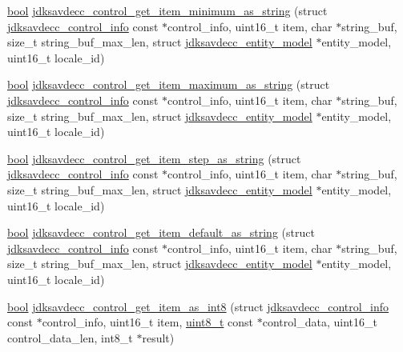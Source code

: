 \begin{DoxyCompactItemize}
\item 
\hyperlink{avb__gptp_8h_af6a258d8f3ee5206d682d799316314b1}{bool} \hyperlink{group__aem__control__value__helpers_ga9226ea8b67000e20966e5b45cd208fcd}{jdksavdecc\+\_\+control\+\_\+get\+\_\+item\+\_\+minimum\+\_\+as\+\_\+string} (struct \hyperlink{structjdksavdecc__control__info}{jdksavdecc\+\_\+control\+\_\+info} const $\ast$control\+\_\+info, uint16\+\_\+t item, char $\ast$string\+\_\+buf, size\+\_\+t string\+\_\+buf\+\_\+max\+\_\+len, struct \hyperlink{structjdksavdecc__entity__model}{jdksavdecc\+\_\+entity\+\_\+model} $\ast$entity\+\_\+model, uint16\+\_\+t locale\+\_\+id)
\item 
\hyperlink{avb__gptp_8h_af6a258d8f3ee5206d682d799316314b1}{bool} \hyperlink{group__aem__control__value__helpers_ga6a350cb659c0d7627d73ca704b0dc36f}{jdksavdecc\+\_\+control\+\_\+get\+\_\+item\+\_\+maximum\+\_\+as\+\_\+string} (struct \hyperlink{structjdksavdecc__control__info}{jdksavdecc\+\_\+control\+\_\+info} const $\ast$control\+\_\+info, uint16\+\_\+t item, char $\ast$string\+\_\+buf, size\+\_\+t string\+\_\+buf\+\_\+max\+\_\+len, struct \hyperlink{structjdksavdecc__entity__model}{jdksavdecc\+\_\+entity\+\_\+model} $\ast$entity\+\_\+model, uint16\+\_\+t locale\+\_\+id)
\item 
\hyperlink{avb__gptp_8h_af6a258d8f3ee5206d682d799316314b1}{bool} \hyperlink{group__aem__control__value__helpers_gaf2be8c114d29b4802860d1380283e1ef}{jdksavdecc\+\_\+control\+\_\+get\+\_\+item\+\_\+step\+\_\+as\+\_\+string} (struct \hyperlink{structjdksavdecc__control__info}{jdksavdecc\+\_\+control\+\_\+info} const $\ast$control\+\_\+info, uint16\+\_\+t item, char $\ast$string\+\_\+buf, size\+\_\+t string\+\_\+buf\+\_\+max\+\_\+len, struct \hyperlink{structjdksavdecc__entity__model}{jdksavdecc\+\_\+entity\+\_\+model} $\ast$entity\+\_\+model, uint16\+\_\+t locale\+\_\+id)
\item 
\hyperlink{avb__gptp_8h_af6a258d8f3ee5206d682d799316314b1}{bool} \hyperlink{group__aem__control__value__helpers_gac6e7d578e07a02f28a25008ae4699a36}{jdksavdecc\+\_\+control\+\_\+get\+\_\+item\+\_\+default\+\_\+as\+\_\+string} (struct \hyperlink{structjdksavdecc__control__info}{jdksavdecc\+\_\+control\+\_\+info} const $\ast$control\+\_\+info, uint16\+\_\+t item, char $\ast$string\+\_\+buf, size\+\_\+t string\+\_\+buf\+\_\+max\+\_\+len, struct \hyperlink{structjdksavdecc__entity__model}{jdksavdecc\+\_\+entity\+\_\+model} $\ast$entity\+\_\+model, uint16\+\_\+t locale\+\_\+id)
\item 
\hyperlink{avb__gptp_8h_af6a258d8f3ee5206d682d799316314b1}{bool} \hyperlink{group__aem__control__value__helpers_ga7d2c3e92550cf29f2e7aaf621a916642}{jdksavdecc\+\_\+control\+\_\+get\+\_\+item\+\_\+as\+\_\+int8} (struct \hyperlink{structjdksavdecc__control__info}{jdksavdecc\+\_\+control\+\_\+info} const $\ast$control\+\_\+info, uint16\+\_\+t item, \hyperlink{stdint_8h_aba7bc1797add20fe3efdf37ced1182c5}{uint8\+\_\+t} const $\ast$control\+\_\+data, uint16\+\_\+t control\+\_\+data\+\_\+len, int8\+\_\+t $\ast$result)

\end{DoxyCompactItemize}
